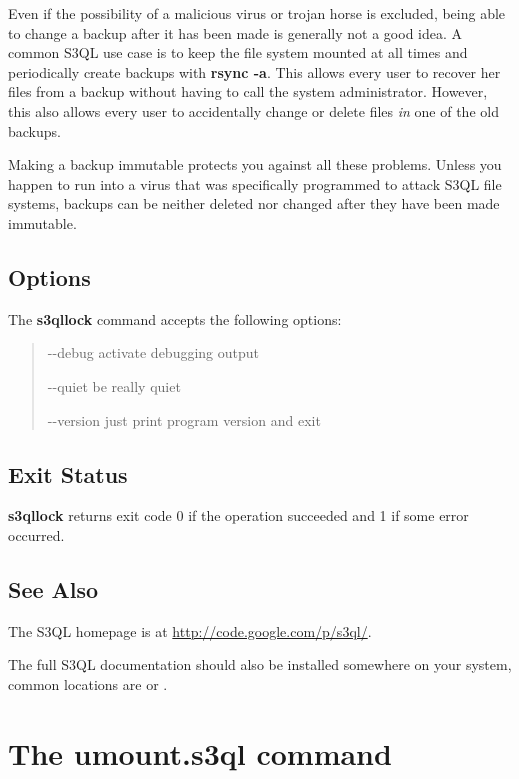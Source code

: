 \documentclass[letterpaper,10pt,english]{sphinxmanual}
\begin{document}
Even if the possibility of a malicious virus or trojan horse is
excluded, being able to change a backup after it has been made is
generally not a good idea. A common S3QL use case is to keep the file
system mounted at all times and periodically create backups with
\textbf{rsync -a}. This allows every user to recover her files from a
backup without having to call the system administrator. However, this
also allows every user to accidentally change or delete files \emph{in} one
of the old backups.

Making a backup immutable protects you against all these problems.
Unless you happen to run into a virus that was specifically programmed
to attack S3QL file systems, backups can be neither deleted nor
changed after they have been made immutable.


\subsection{Options}
\label{man/lock:options}
The \textbf{s3qllock} command accepts the following options:
\begin{quote}
\begin{optionlist}{3cm}
\item [-{-}debug]  
activate debugging output
\item [-{-}quiet]  
be really quiet
\item [-{-}version]  
just print program version and exit
\end{optionlist}
\end{quote}


\subsection{Exit Status}
\label{man/lock:exit-status}
\textbf{s3qllock} returns exit code 0 if the operation succeeded and 1 if some
error occurred.


\subsection{See Also}
\label{man/lock:see-also}
The S3QL homepage is at \href{http://code.google.com/p/s3ql/}{http://code.google.com/p/s3ql/}.

The full S3QL documentation should also be installed somewhere on your
system, common locations are  or
.


\section{The \textbf{umount.s3ql} command}
\label{man/umount::doc}\label{man/umount:the-umount-s3ql-command}
\end{document}
